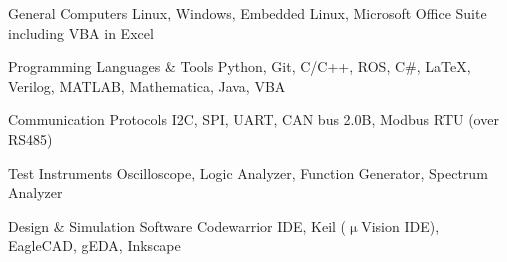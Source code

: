 

\begin{cvskills}

  \cvskill
    {General Computers} %
    {Linux, Windows, Embedded Linux, Microsoft Office Suite including VBA in Excel} %

  \cvskill
    {Programming Languages \& Tools} %
    {Python, Git, C/C++, ROS, C\#, LaTeX, Verilog, MATLAB, Mathematica, Java, VBA} %

  \cvskill
    {Communication Protocols} %
    {I2C, SPI, UART, CAN bus 2.0B, Modbus RTU (over RS485)} %

  \cvskill
    {Test Instruments} %
    {Oscilloscope, Logic Analyzer, Function Generator, Spectrum Analyzer} %

  \cvskill
    {Design \& Simulation Software} %
    {Codewarrior IDE, Keil ($\upmu$Vision IDE), EagleCAD, gEDA, Inkscape} %

\end{cvskills}
